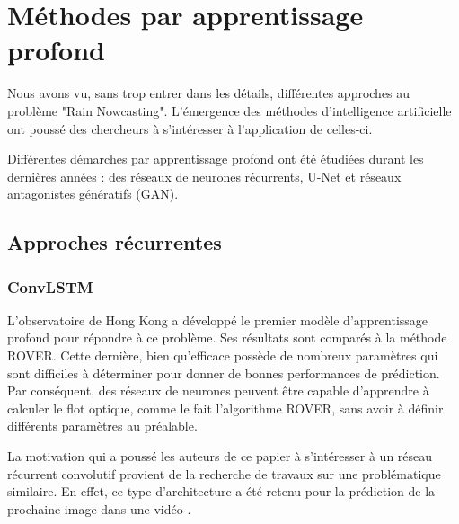 \documentclass[12pt,a4paper,french]{article}
\newcommand\secspacing{1.5cm}
\newcommand\subsecspacing{1cm}
\begin{document}
\vspace{\secspacing}

\section{Méthodes par apprentissage profond}

Nous avons vu, sans trop entrer dans les détails, différentes approches au problème "Rain Nowcasting". L'émergence des méthodes d'intelligence artificielle ont poussé des chercheurs à s'intéresser à l'application de celles-ci.

Différentes démarches par apprentissage profond ont été étudiées durant les dernières années : des réseaux de neurones récurrents, U-Net et réseaux antagonistes génératifs (GAN). 

\vspace{\subsecspacing}

\subsection{Approches récurrentes}

\vspace{\subsecspacing}

\subsubsection{ConvLSTM}

L'observatoire de Hong Kong a développé le premier modèle d'apprentissage profond pour répondre à ce problème. Ses résultats sont comparés à la méthode ROVER. Cette dernière, bien qu'efficace possède de nombreux paramètres qui sont difficiles à déterminer pour donner de bonnes performances de prédiction. Par conséquent, des réseaux de neurones peuvent être capable d'apprendre à calculer le flot optique, comme le fait l'algorithme ROVER, sans avoir à définir différents paramètres au préalable. 
\newline

La motivation qui a poussé les auteurs de ce papier à s'intéresser à un réseau récurrent convolutif provient de la recherche de travaux sur une problématique similaire. En effet, ce type d'architecture a été retenu pour la prédiction de la prochaine image dans une vidéo \cite{Ranzato2014Video}. \newline
\end{document}
